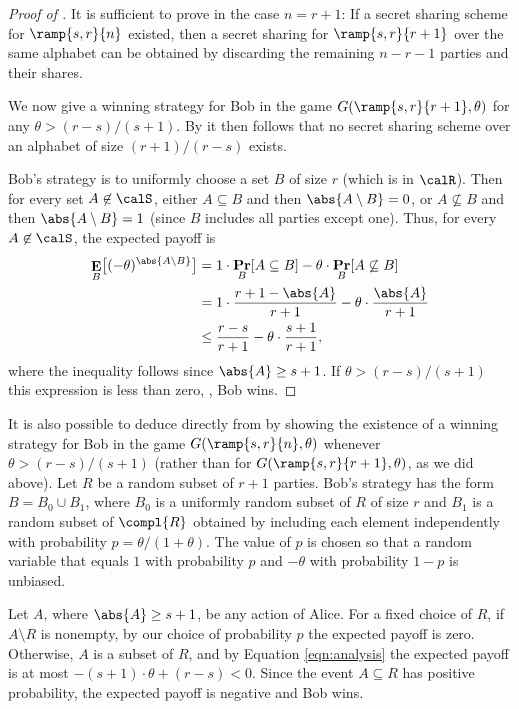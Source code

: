 \documentclass{toc}
\DeclareMathOperator\pr{\mathop{\bf Pr}}
\DeclareMathOperator\E{\mathop{\bf E}}
\begin{document}
\begin{proof}[Proof of ]
	It is sufficient to prove  in the case $n = r + 1$:  If a secret sharing scheme for $\ramp{s, r}{n}$ existed, then a secret sharing for $\ramp{s, r}{r + 1} $ over the same alphabet can be obtained by discarding the remaining $n - r - 1$ parties and their shares.
	
	We now give a winning strategy for Bob in the game $G(\ramp{s, r}{r + 1}, \theta)$ for any $\theta > (r - s)/(s + 1)$.  By  it then follows that no secret sharing scheme over an alphabet of size $(r + 1)/(r - s)$ exists.
	
	Bob's strategy is to uniformly choose a set $B$ of size $r$ (which is in $\calR$).  Then for every set $A \not\in \calS$, either $A \subseteq B$ and then $\abs{A\setminus B} = 0$, or
	$A\not\subseteq B$ and then $\abs{A\setminus B} = 1$ (since $B$ includes all
	parties except one). Thus, for every $A\not\in \calS$, the expected payoff is
	\begin{align}
	\label{eqn:analysis}
	\E_B\bigl[(-\theta)^{\abs{A \setminus B}}\bigr] 
	&= 1 \cdot \pr_B[A \subseteq B] - \theta \cdot \pr_B[A \not\subseteq B] \notag \\
	&= 1 \cdot \frac{r + 1 - \abs{A}}{r + 1} - \theta \cdot \frac{\abs{A}}{r + 1} \notag \\
	&\leq \frac{r - s}{r + 1} - \theta \cdot \frac{s + 1}{r + 1},
	\end{align}
	where the inequality follows since $\abs{A} \geq s+1$.  If $\theta > (r - s)/(s + 1)$ this expression is less than zero, \ie, Bob wins.
\end{proof}

It is also possible to deduce  directly from
 by showing the existence of a winning strategy for Bob in
the game $G(\ramp{s, r}{n}, \theta)$ whenever $\theta > (r - s)/(s + 1)$ (rather
than for $G(\ramp{s, r}{r+1}, \theta)$, as we did above).  Let $R$ be a random subset of $r + 1$ parties.  Bob's strategy has the form $B = B_0 \cup B_1$, where $B_0$ is a uniformly random subset of $R$ of size $r$ and $B_1$ is a random subset of $\compl{R}$ obtained by including each element independently with probability $p = \theta/(1 + \theta)$.  The value of $p$ is chosen so that a random variable that equals $1$ with probability $p$ and $-\theta$ with probability $1 - p$ is unbiased.

Let $A$, where $\abs{A} \geq s + 1$, be any action of Alice.  For a fixed choice
of $R$, if $A \setminus R$ is nonempty, by our choice of probability $p$ the
expected payoff is zero.  Otherwise, $A$ is a subset of $R$, and by Equation \eqref{eqn:analysis} the expected payoff is at most $-(s + 1) \cdot \theta + (r - s) < 0$.  Since the event $A \subseteq R$ has positive probability, the expected payoff is negative and Bob wins.
\end{document}
